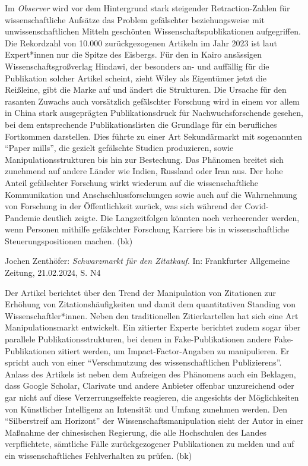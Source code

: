 \documentclass[a4paper,
fontsize=11pt,
oneside,
numbers=noperiodatend,
parskip=half-,
bibliography=totoc,
final
]{scrartcl}
\begin{document}
Im \emph{Observer} wird vor dem Hintergrund stark steigender
Retraction-Zahlen für wissenschaftliche Aufsätze das Problem gefälschter
beziehungsweise mit unwissenschaftlichen Mitteln geschönten
Wissenschaftspublikationen aufgegriffen. Die Rekordzahl von 10.000
zurückgezogenen Artikeln im Jahr 2023 ist laut Expert*innen nur die
Spitze des Eisbergs. Für den in Kairo ansässigen Wissenschaftsgroßverlag
Hindawi, der besonders an- und auffällig für die Publikation solcher
Artikel scheint, zieht Wiley als Eigentümer jetzt die Reißleine, gibt
die Marke auf und ändert die Strukturen. Die Ursache für den rasanten
Zuwachs auch vorsätzlich gefälschter Forschung wird in einem vor allem
in China stark ausgeprägten Publikationsdruck für Nachwuchsforschende
gesehen, bei dem entsprechende Publikationslisten die Grundlage für ein
berufliches Fortkommen darstellen. Dies führte zu einer Art
Sekundärmarkt mit sogenannten \enquote{Paper mills}, die gezielt
gefälschte Studien produzieren, sowie Manipulationsstrukturen bis hin
zur Bestechung. Das Phänomen breitet sich zunehmend auf andere Länder
wie Indien, Russland oder Iran aus. Der hohe Anteil gefälschter
Forschung wirkt wiederum auf die wissenschaftliche Kommunikation und
Anschschlussforschungen sowie auch auf die Wahrnehmung von Forschung in
der Öffentlichkeit zurück, was sich während der Covid-Pandemie deutlich
zeigte. Die Langzeitfolgen könnten noch verheerender werden, wenn
Personen mithilfe gefälschter Forschung Karriere bis in
wissenschaftliche Steuerungspositionen machen. (bk)

Jochen Zenthöfer: \emph{Schwarzmarkt für den Zitatkauf}. In: Frankfurter
Allgemeine Zeitung, 21.02.2024, S. N4

Der Artikel berichtet über den Trend der Manipulation von Zitationen zur
Erhöhung von Zitationshäufigkeiten und damit dem quantitativen Standing
von Wissenschaftler*innen. Neben den traditionellen Zitierkartellen hat
sich eine Art Manipulationsmarkt entwickelt. Ein zitierter Experte
berichtet zudem sogar über parallele Publikationsstrukturen, bei denen
in Fake-Publikationen andere Fake-Publikationen zitiert werden, um
Impact-Factor-Angaben zu manipulieren. Er spricht auch von einer
\enquote{Verschmutzung des wissenschaftlichen Publizierens}. Anlass des
Artikels ist neben dem Aufzeigen des Phänomens auch ein Beklagen, dass
Google Scholar, Clarivate und andere Anbieter offenbar unzureichend oder
gar nicht auf diese Verzerrungseffekte reagieren, die angesichts der
Möglichkeiten von Künstlicher Intelligenz an Intensität und Umfang
zunehmen werden. Den \enquote{Silberstreif am Horizont} der
Wissenschaftsmanipulation sieht der Autor in einer Maßnahme der
chinesischen Regierung, die alle Hochschulen des Landes verpflichtete,
sämtliche Fälle zurückgezogener Publikationen zu melden und auf ein
wissenschaftliches Fehlverhalten zu prüfen. (bk)
\end{document}
